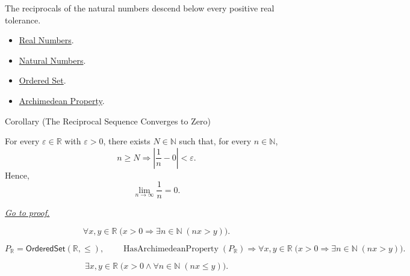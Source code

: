 \begin{remark*}[Interpretation]
The reciprocals of the natural numbers descend below every positive real
tolerance.
\end{remark*}

\begin{dependencies}
\begin{itemize}
\item \hyperref[def:reals]{Real Numbers}.
\item \hyperref[def:natural-numbers]{Natural Numbers}.
\item \hyperref[def:ordered-set]{Ordered Set}.
\item \hyperref[thm:archimedean-property]{Archimedean Property}.
\end{itemize}
\end{dependencies}



\begin{corollarybox}{Corollary (The Reciprocal Sequence Converges to Zero)}
\begin{corollary}
\label{cor:archimedean-reciprocal}
For every $\varepsilon\in\mathbb{R}$ with $\varepsilon>0$, there exists
$N\in\mathbb{N}$ such that, for every $n\in\mathbb{N}$,
\[
  n\geq N
  \Longrightarrow
  \left|\frac{1}{n}-0\right|<\varepsilon.
\]
Hence,
\[
  \lim_{n\longrightarrow\infty}\frac{1}{n}=0.
\]

\smallskip
\noindent
\hyperref[prf:archimedean-reciprocal]{\textit{Go to proof.}}
\end{corollary}
\end{corollarybox}

\begin{remark*}
\[
\forall x,y\in\mathbb{R}\;\bigl(x>0\Longrightarrow \exists n\in\mathbb{N}\;(nx>y)\bigr).
\]
\end{remark*}

\begin{remark*}
\[
P_{\mathbb{R}}=\mathsf{OrderedSet}(\mathbb{R},\leq),\qquad
\operatorname{HasArchimedeanProperty}(P_{\mathbb{R}})
\Longrightarrow
\forall x,y\in\mathbb{R}\;\bigl(x>0\Longrightarrow \exists n\in\mathbb{N}\;(nx>y)\bigr).
\]
\end{remark*}

\begin{remark*}
\[
\exists x,y\in\mathbb{R}\;\bigl(x>0\land \forall n\in\mathbb{N}\;(nx\le y)\bigr).
\]
\end{remark*}

